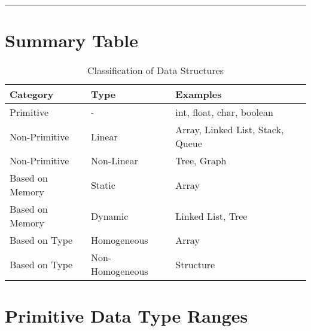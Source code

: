 \vspace{0.5cm}
\hrule
\vspace{0.5cm}

\section*{\Large \textbf{Summary Table}}

\begin{table}[!ht]
\centering
\begin{tabular}{|l|l|l|}
\hline
\textbf{Category} & \textbf{Type} & \textbf{Examples} \\ \hline
Primitive & - & int, float, char, boolean \\ \hline
Non-Primitive & Linear & Array, Linked List, Stack, Queue \\ \hline
Non-Primitive & Non-Linear & Tree, Graph \\ \hline
Based on Memory & Static & Array \\ \hline
Based on Memory & Dynamic & Linked List, Tree \\ \hline
Based on Type & Homogeneous & Array \\ \hline
Based on Type & Non-Homogeneous & Structure \\ \hline
\end{tabular}
\caption{Classification of Data Structures}
\end{table}

\newpage
\section*{\Large \textbf{Primitive Data Type Ranges}}

